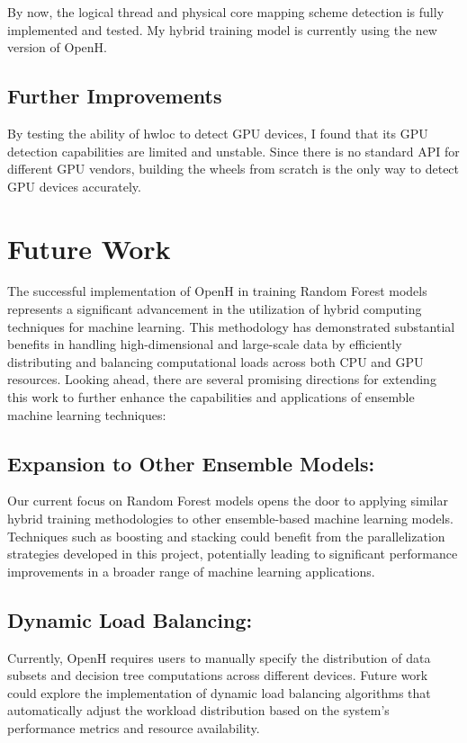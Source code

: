 \documentclass[13pt]{article}
\begin{document}
By now, the logical thread and physical core mapping scheme detection is fully implemented and tested. 
My hybrid training model is currently using the new version of OpenH.

\subsection{Further Improvements}
By testing the ability of hwloc to detect GPU devices, I found that its GPU detection capabilities are limited and unstable.
Since there is no standard API for different GPU vendors, building the wheels from scratch is the only way to detect GPU devices accurately.


\newpage
\section{Future Work}
The successful implementation of OpenH in training Random Forest models represents a significant advancement in the utilization of hybrid computing techniques for machine learning. This methodology has demonstrated substantial benefits in handling high-dimensional and large-scale data by efficiently distributing and balancing computational loads across both CPU and GPU resources. Looking ahead, there are several promising directions for extending this work to further enhance the capabilities and applications of ensemble machine learning techniques:

\subsection{Expansion to Other Ensemble Models:}
Our current focus on Random Forest models opens the door to applying similar hybrid training methodologies to other ensemble-based machine learning models. 
Techniques such as boosting and stacking could benefit from the parallelization strategies developed in this project, potentially leading to significant performance improvements in a broader range of machine learning applications.

\subsection{Dynamic Load Balancing:}
Currently, OpenH requires users to manually specify the distribution of data subsets and decision tree computations across different devices. 
Future work could explore the implementation of dynamic load balancing algorithms that automatically adjust the workload distribution based on the system's performance metrics and resource availability.
\end{document}
